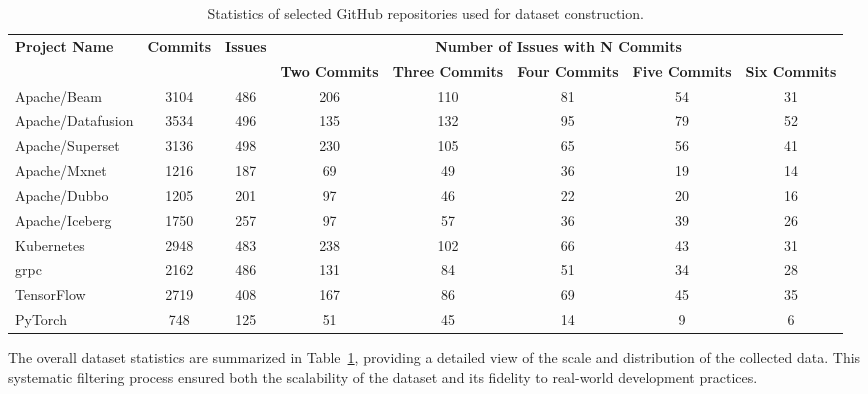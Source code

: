 \begin{table}[htbp]
\centering
\caption{Statistics of selected GitHub repositories used for dataset construction.}
\renewcommand{\arraystretch}{1.2}
\setlength{\tabcolsep}{4pt}
\label{stats}
\scriptsize
\begin{tabular}{p{2.5cm}ccccccc}
\hline
\multirow{2}{*}{\textbf{Project Name}} & 
\multirow{2}{*}{\textbf{Commits}} & 
\multirow{2}{*}{\textbf{Issues}} &
\multicolumn{5}{c}{\textbf{Number of Issues with N Commits}} \\ \cline{4-8}
 &  &  & \textbf{Two Commits} & \textbf{Three Commits} & \textbf{Four Commits} & \textbf{Five Commits} & \textbf{Six Commits} \\ \hline
Apache/Beam        & 3104 & 486 & 206 & 110 & 81 & 54 & 31 \\
Apache/Datafusion  & 3534 & 496 & 135 & 132 & 95 & 79 & 52 \\
Apache/Superset    & 3136 & 498 & 230 & 105 & 65 & 56 & 41 \\
Apache/Mxnet       & 1216 & 187 & 69 & 49 & 36 & 19 & 14 \\
Apache/Dubbo       & 1205 & 201 & 97 & 46 & 22 & 20 & 16 \\
Apache/Iceberg     & 1750 & 257 & 97 & 57 & 36 & 39 & 26 \\
Kubernetes         & 2948 & 483 & 238 & 102 & 66 & 43 & 31 \\
grpc               & 2162 & 486 & 131 & 84 & 51 & 34 & 28 \\
TensorFlow         & 2719 & 408 & 167 & 86 & 69 & 45 & 35 \\
PyTorch            & 748  & 125 & 51 & 45 & 14 & 9 & 6 \\ \hline
\end{tabular}
\end{table}

The overall dataset statistics are summarized in Table~\ref{stats}, providing a detailed view of the scale and distribution of the collected data. This systematic filtering process ensured both the scalability of the dataset and its fidelity to real-world development practices.

